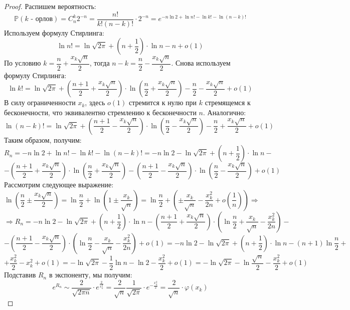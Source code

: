 \documentclass[12pt]{article}
\theoremstyle{definition}
\begin{document}
\begin{proof}
	Распишем вероятность:
	$$
		\mathbb{P}(\text{$k$ - орлов}) = C_n^k 2^{-n} = \dfrac{n!}{k!(n-k)!}{\cdot}2^{-n} = e^{-n\ln{2} + \ln{n!} - \ln{k!} - \ln{(n-k)!}}
	$$
	Используем формулу Стирлинга:
	$$
		\ln{n!} = \ln{\sqrt{2\pi}} + \left(n + \dfrac{1}{2}\right){\cdot}\ln{n} - n + o(1)
	$$
	По условию $k = \dfrac{n}{2} + \dfrac{x_k \sqrt{n}}{2}$, тогда $n-k = \dfrac{n}{2} - \dfrac{x_k \sqrt{n}}{2}$. Снова используем формулу Стирлинга:
	$$
		\ln{k!} = \ln{\sqrt{2\pi}} + \left(\dfrac{n +1}{2} + \dfrac{x_k \sqrt{n}}{2} \right){\cdot}\ln{\left(\dfrac{n}{2} + \dfrac{x_k \sqrt{n}}{2}\right)} - \dfrac{n}{2} - \dfrac{x_k \sqrt{n}}{2} + o(1)
	$$
	В силу ограниченности $x_k$, здесь $o(1)$ стремится к нулю при $k$ стремящемся к бесконечности, что эквивалентно стремлению к бесконечности $n$. Аналогично:
	$$
		\ln{(n-k)!} = \ln{\sqrt{2\pi}} + \left(\dfrac{n +1}{2} - \dfrac{x_k \sqrt{n}}{2} \right){\cdot}\ln{\left(\dfrac{n}{2} - \dfrac{x_k \sqrt{n}}{2}\right)} - \dfrac{n}{2} + \dfrac{x_k \sqrt{n}}{2} + o(1)
	$$
	Таким образом, получим:
	$$
		R_n = -n\ln{2} + \ln{n!} - \ln{k!} - \ln{(n-k)!} = -n\ln{2} - \ln{\sqrt{2\pi}} + \left(n + \dfrac{1}{2}\right){\cdot}\ln{n} - 
	$$
	$$
		- \left(\dfrac{n +1}{2} + \dfrac{x_k \sqrt{n}}{2} \right){\cdot}\ln{\left(\dfrac{n}{2} + \dfrac{x_k \sqrt{n}}{2}\right)} - \left(\dfrac{n +1}{2} - \dfrac{x_k \sqrt{n}}{2} \right){\cdot}\ln{\left(\dfrac{n}{2} - \dfrac{x_k \sqrt{n}}{2}\right)} + o(1)
	$$
	Рассмотрим следующее выражение:
	$$
		\ln{\left(\dfrac{n}{2} \pm \dfrac{x_k \sqrt{n}}{2}\right)} = \ln{\dfrac{n}{2}} + \ln{\left(1 \pm \dfrac{x_k}{\sqrt{n}}\right)} = \ln{\dfrac{n}{2}} + \left(\pm \dfrac{x_k}{\sqrt{n}} - \dfrac{x_k^2}{2n} + o\left(\dfrac{1}{n}\right)\right) \Rightarrow
	$$
	$$
		\Rightarrow R_n = -n\ln{2} - \ln{\sqrt{2\pi}} + \left(n + \dfrac{1}{2}\right){\cdot}\ln{n} 	- \left(\dfrac{n +1}{2} + \dfrac{x_k \sqrt{n}}{2} \right){\cdot}\left(\ln{\dfrac{n}{2}} +  \dfrac{x_k}{\sqrt{n}} - \dfrac{x_k^2}{2n} \right) - 
	$$
	$$
		- \left(\dfrac{n +1}{2} - \dfrac{x_k \sqrt{n}}{2} \right){\cdot}\left(\ln{\dfrac{n}{2}} - \dfrac{x_k}{\sqrt{n}} - \dfrac{x_k^2}{2n}\right) + o(1) = -n\ln{2} - \ln{\sqrt{2\pi}} + \left(n + \dfrac{1}{2}\right){\cdot}\ln{n} - (n+1)\ln{\dfrac{n}{2}} +
	$$
	$$
		+ \dfrac{x_k^2}{2} - x_k^2 + o(1) = - \ln{\sqrt{2\pi}} - \dfrac{1}{2}\ln{n} - \ln{2} - \dfrac{x_k^2}{2} + o(1) = - \ln{\sqrt{2\pi}} - \ln{\dfrac{\sqrt{n}}{2}}- \dfrac{x_k^2}{2} + o(1)
	$$
	Подставив $R_n$ в экспоненту, мы получим:
	$$
		e^{R_n} \sim \dfrac{2}{\sqrt{2\pi n}}{\cdot}e^{\tfrac{2}{x_k^2}} = \dfrac{2}{\sqrt{n}}\dfrac{1}{\sqrt{2\pi }}{\cdot}e^{-\tfrac{x_k^2}{2}}=  \dfrac{2}{\sqrt{n}}{\cdot}\varphi(x_k)
	$$
\end{proof}
\end{document}
